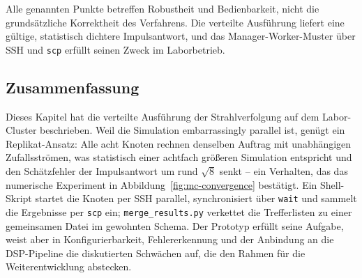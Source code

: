 Alle genannten Punkte betreffen Robustheit und Bedienbarkeit, nicht die
grundsätzliche Korrektheit des Verfahrens. Die verteilte Ausführung liefert eine
gültige, statistisch dichtere Impulsantwort, und das Manager-Worker-Muster über
SSH und \texttt{scp} erfüllt seinen Zweck im Laborbetrieb.

\subsection{Zusammenfassung}
\label{subsec:cluster-zusammenfassung}

Dieses Kapitel hat die verteilte Ausführung der Strahlverfolgung auf dem
Labor-Cluster beschrieben. Weil die Simulation embarrassingly parallel ist, genügt
ein Replikat-Ansatz: Alle acht Knoten rechnen denselben Auftrag mit unabhängigen
Zufallsströmen, was statistisch einer achtfach größeren Simulation entspricht und
den Schätzfehler der Impulsantwort um rund $\sqrt{8}$ senkt -- ein Verhalten, das
das numerische Experiment in Abbildung~\ref{fig:mc-convergence} bestätigt. Ein
Shell-Skript startet die Knoten per SSH parallel, synchronisiert über \texttt{wait}
und sammelt die Ergebnisse per \texttt{scp} ein; \texttt{merge\_results.py}
verkettet die Trefferlisten zu einer gemeinsamen Datei im gewohnten Schema. Der
Prototyp erfüllt seine Aufgabe, weist aber in Konfigurierbarkeit, Fehlererkennung
und der Anbindung an die DSP-Pipeline die diskutierten Schwächen auf, die den
Rahmen für die Weiterentwicklung abstecken.

